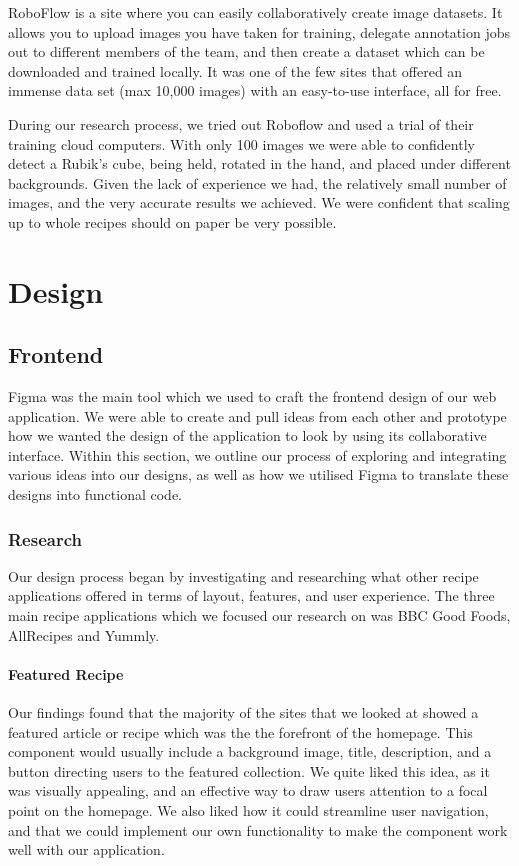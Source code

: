 \documentclass{article}
\begin{document}
RoboFlow \cite{RoboFlow-Software} is a site where you can easily collaboratively create image datasets. It allows you to upload images you have taken for training, delegate annotation jobs out to different members of the team, and then create a dataset which can be downloaded and trained locally. It was one of the few sites that offered an immense data set (max 10,000 images) with an easy-to-use interface, all for free.

During our research process, we tried out Roboflow and used a trial of their training cloud computers. With only 100 images we were able to confidently detect a Rubik's cube, being held, rotated in the hand, and placed under different backgrounds. Given the lack of experience we had, the relatively small number of images, and the very accurate results we achieved. We were confident that scaling up to whole recipes should on paper be very possible.
    
\section{Design}
\subsection{Frontend}
Figma was the main tool which we used to craft the frontend design of our web application. We were able to create and pull ideas from each other and prototype how we wanted the design of the application to look by using its collaborative interface. Within this section, we outline our process of exploring and integrating various ideas into our designs, as well as how we utilised Figma to translate these designs into functional code.

\subsubsection{Research}

Our design process began by investigating and researching what other recipe applications offered in terms of layout, features, and user experience. The three main recipe applications which we focused our research on was BBC Good Foods, AllRecipes and Yummly. 

\paragraph{Featured Recipe}
Our findings found that the majority of the sites that we looked at showed a featured article or recipe which was the the forefront of the homepage. This component would usually include a background image, title, description, and a button directing users to the featured collection. We quite liked this idea, as it was visually appealing, and an effective way to draw users attention to a focal point on the homepage. We also liked how it could streamline user navigation, and that we could implement our own functionality to make the component work well with our application.
\end{document}
